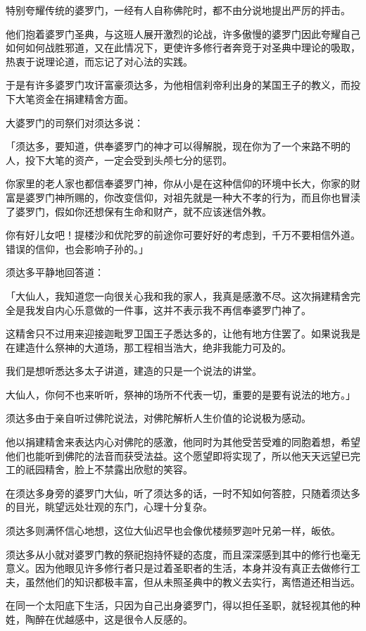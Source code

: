 \documentclass[twoside,openany]{book}
\begin{document}
特别夸耀传统的婆罗门，一经有人自称佛陀时，都不由分说地提出严厉的抨击。

他们抱着婆罗门圣典，与这班人展开激烈的论战，许多傲慢的婆罗门因此夸耀自己如何如何战胜邪道，又在此情况下，更使许多修行者奔竞于对圣典中理论的吸取，热衷于说理论道，而忘记了对心法的实践。

于是有许多婆罗门攻讦富豪须达多，为他相信刹帝利出身的某国王子的教义，而投下大笔资金在捐建精舍方面。

大婆罗门的司祭们对须达多说：

「须达多，要知道，供奉婆罗门的神才可以得解脱，现在你为了一个来路不明的人，投下大笔的资产，一定会受到头颅七分的惩罚。

你家里的老人家也都信奉婆罗门神，你从小是在这种信仰的环境中长大，你家的财富是婆罗门神所赐的，你改变信仰，对祖先就是一种大不孝的行为，而且你也冒渎了婆罗门，假如你还想保有生命和财产，就不应该迷信外教。

你有好儿女吧！提楼沙和优陀罗的前途你可要好好的考虑到，千万不要相信外道。错误的信仰，也会影响子孙的。」

须达多平静地回答道：

「大仙人，我知道您一向很关心我和我的家人，我真是感激不尽。这次捐建精舍完全是我发自内心乐意做的一件事，这并不表示我不再信奉婆罗门神了。

这精舍只不过用来迎接迦毗罗卫国王子悉达多的，让他有地方住罢了。如果说我是在建造什么祭神的大道场，那工程相当浩大，绝非我能力可及的。

我们是想听悉达多太子讲道，建造的只是一个说法的讲堂。

大仙人，你何不也来听听，祭神的场所不代表一切，重要的是要有说法的地方。」

须达多由于亲自听过佛陀说法，对佛陀解析人生价值的论说极为感动。

他以捐建精舍来表达内心对佛陀的感激，他同时为其他受苦受难的同胞着想，希望他们也能听到佛陀的法音而获受法益。这个愿望即将实现了，所以他天天远望已完工的祇园精舍，脸上不禁露出欣慰的笑容。

在须达多身旁的婆罗门大仙，听了须达多的话，一时不知如何答腔，只随着须达多的目光，眺望远处壮观的东门，心理十分复杂。

须达多则满怀信心地想，这位大仙迟早也会像优楼频罗迦叶兄弟一样，皈依。

须达多从小就对婆罗门教的祭祀抱持怀疑的态度，而且深深感到其中的修行也毫无意义。因为他眼见许多修行者只是过着圣职者的生活，本身并没有真正去做修行工夫，虽然他们的知识都极丰富，但从未照圣典中的教义去实行，离悟道还相当远。

在同一个太阳底下生活，只因为自己出身婆罗门，得以担任圣职，就轻视其他的种姓，陶醉在优越感中，这是很令人反感的。
\end{document}
